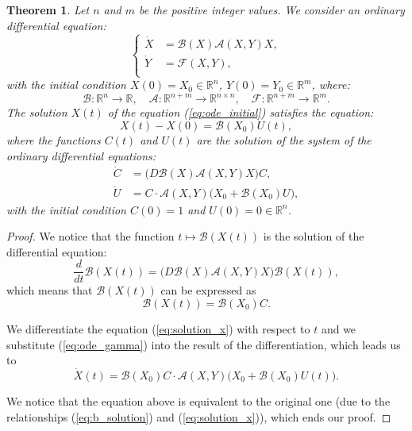 \documentclass[10pt,a4paper]{amsart}
\newtheorem{theorem}{Theorem}
\begin{document}
\begin{theorem}
    \label{thm:exp_trick}
    Let $n$ and $m$ be the positive integer values. We consider an ordinary differential equation:
    \begin{equation}
        \label{eq:ode_initial}
        \begin{cases}
            \dot{X} &= \mathcal{B}(X) \mathcal{A}(X,Y) X, \\
            \dot{Y} &= \mathcal{F}(X,Y), \\
        \end{cases}
    \end{equation}
    with the initial condition $X(0) = X_0 \in \mathbb{R}^n$, $Y(0) = Y_0 \in \mathbb{R}^m$, where:
    \[
        \mathcal{B} : \mathbb{R}^n \to \mathbb{R}, \quad
        \mathcal{A} : \mathbb{R}^{n+m} \to \mathbb{R}^{n \times n}, \quad
        \mathcal{F} : \mathbb{R}^{n+m} \to \mathbb{R}^m.
    \]
    The solution $X(t)$ of the equation (\ref{eq:ode_initial}) satisfies the equation:
    \begin{equation}
        \label{eq:solution_x}
        X(t) - X(0) = \mathcal{B}(X_0) U(t),
    \end{equation}
    where the functions $C(t)$ and $U(t)$ are the solution of the system of the ordinary differential equations:
    \begin{align}
        \dot{C} &= \big( D \mathcal{B}(X) \mathcal{A}(X,Y) X \big) C, \label{eq:ode_c} \\
        \dot{U} &= C \cdot \mathcal{A}(X,Y) \big( X_0 + \mathcal{B}(X_0) U \big), \label{eq:ode_gamma}
    \end{align}
    with the initial condition $C(0) = 1$ and $U(0) = 0 \in \mathbb{R}^n$.
\end{theorem}

\begin{proof}
    We notice that the function $t \mapsto \mathcal{B}(X(t))$ is the solution of the differential equation:
    \begin{equation}
        \label{eq:ode_b}
        \frac{d}{dt} \mathcal{B}(X(t)) = \big( D \mathcal{B}( X ) \mathcal{A}(X,Y) X \big) \mathcal{B}(X(t)),
    \end{equation}
    which means that $\mathcal{B}(X(t))$ can be expressed as
    \begin{equation}
        \label{eq:b_solution}
        \mathcal{B}(X(t)) = \mathcal{B}(X_0) C.
    \end{equation}

    We differentiate the equation (\ref{eq:solution_x}) with respect to $t$ and we substitute (\ref{eq:ode_gamma}) into the result of the differentiation, which leads us to
    \begin{equation}
        \label{eq:ode_x_2}
        \dot{X}(t) = \mathcal{B}(X_0) C \cdot \mathcal{A}(X,Y) \big( X_0 + \mathcal{B}(X_0) U(t) \big).
    \end{equation}

    We notice that the equation above is equivalent to the original one (due to the relationships (\ref{eq:b_solution}) and (\ref{eq:solution_x})), which ends our proof.
\end{proof}
\end{document}
